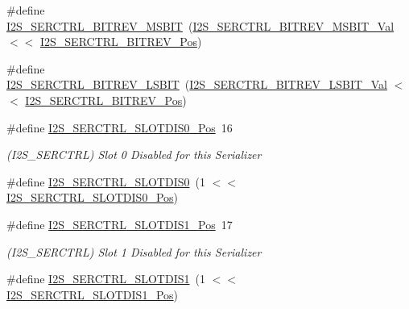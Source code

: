 \begin{DoxyCompactItemize}
\#define \mbox{\hyperlink{group___s_a_m_d21___i2_s_ga3c5febeef83fc70d3dd0c003c3ccdaaa}{I2\+S\+\_\+\+S\+E\+R\+C\+T\+R\+L\+\_\+\+B\+I\+T\+R\+E\+V\+\_\+\+M\+S\+B\+IT}}~(\mbox{\hyperlink{group___s_a_m_d21___i2_s_ga1e12a16e85413459c1f5314709f3e221}{I2\+S\+\_\+\+S\+E\+R\+C\+T\+R\+L\+\_\+\+B\+I\+T\+R\+E\+V\+\_\+\+M\+S\+B\+I\+T\+\_\+\+Val}}  $<$$<$ \mbox{\hyperlink{group___s_a_m_d21___i2_s_gacf706f7557401ecf0b8b6068722f5f30}{I2\+S\+\_\+\+S\+E\+R\+C\+T\+R\+L\+\_\+\+B\+I\+T\+R\+E\+V\+\_\+\+Pos}})
\item 
\#define \mbox{\hyperlink{group___s_a_m_d21___i2_s_gabc432220014ec0c32a81d134fae3022d}{I2\+S\+\_\+\+S\+E\+R\+C\+T\+R\+L\+\_\+\+B\+I\+T\+R\+E\+V\+\_\+\+L\+S\+B\+IT}}~(\mbox{\hyperlink{group___s_a_m_d21___i2_s_ga820e46dc076eb13930ff13c820c0ace0}{I2\+S\+\_\+\+S\+E\+R\+C\+T\+R\+L\+\_\+\+B\+I\+T\+R\+E\+V\+\_\+\+L\+S\+B\+I\+T\+\_\+\+Val}}  $<$$<$ \mbox{\hyperlink{group___s_a_m_d21___i2_s_gacf706f7557401ecf0b8b6068722f5f30}{I2\+S\+\_\+\+S\+E\+R\+C\+T\+R\+L\+\_\+\+B\+I\+T\+R\+E\+V\+\_\+\+Pos}})
\item 
\#define \mbox{\hyperlink{group___s_a_m_d21___i2_s_ga652fec8bb595128c1fc61565704cc2a2}{I2\+S\+\_\+\+S\+E\+R\+C\+T\+R\+L\+\_\+\+S\+L\+O\+T\+D\+I\+S0\+\_\+\+Pos}}~16
\begin{DoxyCompactList}\small\item\em (I2\+S\+\_\+\+S\+E\+R\+C\+T\+RL) Slot 0 Disabled for this Serializer \end{DoxyCompactList}\item 
\#define \mbox{\hyperlink{group___s_a_m_d21___i2_s_ga1348b876ae7db929f8580ff1930411e8}{I2\+S\+\_\+\+S\+E\+R\+C\+T\+R\+L\+\_\+\+S\+L\+O\+T\+D\+I\+S0}}~(1 $<$$<$ \mbox{\hyperlink{group___s_a_m_d21___i2_s_ga652fec8bb595128c1fc61565704cc2a2}{I2\+S\+\_\+\+S\+E\+R\+C\+T\+R\+L\+\_\+\+S\+L\+O\+T\+D\+I\+S0\+\_\+\+Pos}})
\item 
\#define \mbox{\hyperlink{group___s_a_m_d21___i2_s_ga2e2c7462e16d89edfa1604d3bc50cb1b}{I2\+S\+\_\+\+S\+E\+R\+C\+T\+R\+L\+\_\+\+S\+L\+O\+T\+D\+I\+S1\+\_\+\+Pos}}~17
\begin{DoxyCompactList}\small\item\em (I2\+S\+\_\+\+S\+E\+R\+C\+T\+RL) Slot 1 Disabled for this Serializer \end{DoxyCompactList}\item 
\#define \mbox{\hyperlink{group___s_a_m_d21___i2_s_ga2393145dbd8b5c7329d84d63894e0045}{I2\+S\+\_\+\+S\+E\+R\+C\+T\+R\+L\+\_\+\+S\+L\+O\+T\+D\+I\+S1}}~(1 $<$$<$ \mbox{\hyperlink{group___s_a_m_d21___i2_s_ga2e2c7462e16d89edfa1604d3bc50cb1b}{I2\+S\+\_\+\+S\+E\+R\+C\+T\+R\+L\+\_\+\+S\+L\+O\+T\+D\+I\+S1\+\_\+\+Pos}})

\end{DoxyCompactItemize}
